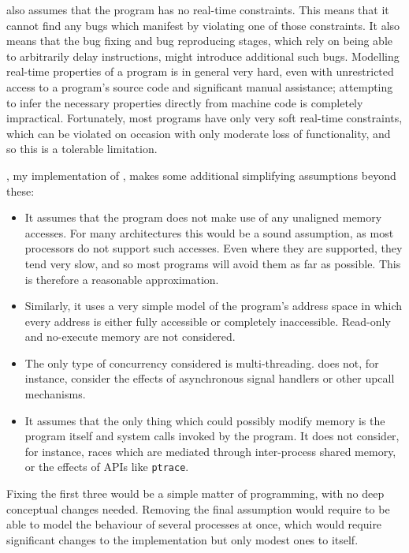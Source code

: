 {\Technique} also assumes that the program has no real-time
constraints.  This means that it cannot find any bugs which manifest
by violating one of those constraints.  It also means that the bug
fixing and bug reproducing stages, which rely on being able to
arbitrarily delay instructions, might introduce additional such bugs.
Modelling real-time properties of a program is in general very hard,
even with unrestricted access to a program's source code and
significant manual assistance\needCite{}; attempting to infer the
necessary properties directly from machine code is completely
impractical.  Fortunately, most programs have only very soft real-time
constraints, which can be violated on occasion with only moderate loss
of functionality, and so this is a tolerable limitation.

{\Implementation}, my implementation of {\technique}, makes some
additional simplifying assumptions beyond these:

\begin{itemize}
\item It assumes that the program does not make use of any unaligned
  memory accesses.  For many architectures this would be a sound
  assumption, as most processors do not support such accesses.  Even
  where they are supported, they tend very slow, and so most programs
  will avoid them as far as possible.  This is therefore a reasonable
  approximation.

\item Similarly, it uses a very simple model of the program's address
  space in which every address is either fully accessible or
  completely inaccessible.  Read-only and no-execute memory\needCite{}
  are not considered.

\item The only type of concurrency considered is multi-threading.
  {\Implementation} does not, for instance, consider the effects of
  asynchronous signal handlers or other upcall mechanisms.

\item It assumes that the only thing which could possibly modify
  memory is the program itself and system calls invoked by the
  program.  It does not consider, for instance, races which are
  mediated through inter-process shared memory, or the effects of APIs
  like \texttt{ptrace}.
\end{itemize}

Fixing the first three would be a simple matter of programming, with
no deep conceptual changes needed.  Removing the final assumption
would require {\implementation} to be able to model the behaviour of
several processes at once, which would require significant changes to
the implementation but only modest ones to {\technique} itself.
